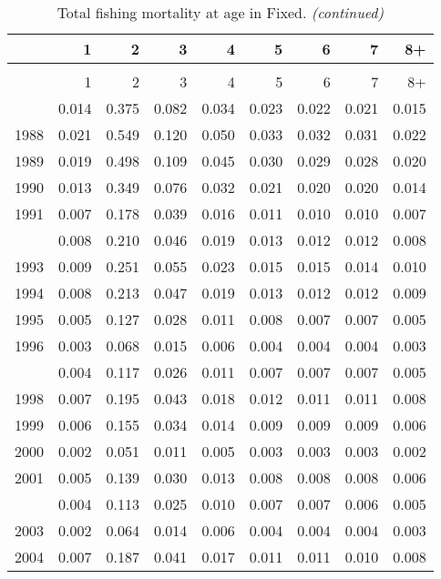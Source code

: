\documentclass[
]{article}
\begin{document}
\begin{longtable}[t]{lrrrrrrrr}
\caption{\label{tab:Fixed-fleet-FAA-table}Total fishing mortality at age in Fixed.}\\
\toprule
  & 1 & 2 & 3 & 4 & 5 & 6 & 7 & 8+\\
\midrule
\endfirsthead
\caption[]{Total fishing mortality at age in Fixed. \textit{(continued)}}\\
\toprule
  & 1 & 2 & 3 & 4 & 5 & 6 & 7 & 8+\\
\midrule
\endhead

\endfoot
\bottomrule
\endlastfoot
1987 & 0.014 & 0.375 & 0.082 & 0.034 & 0.023 & 0.022 & 0.021 & 0.015\\
1988 & 0.021 & 0.549 & 0.120 & 0.050 & 0.033 & 0.032 & 0.031 & 0.022\\
1989 & 0.019 & 0.498 & 0.109 & 0.045 & 0.030 & 0.029 & 0.028 & 0.020\\
1990 & 0.013 & 0.349 & 0.076 & 0.032 & 0.021 & 0.020 & 0.020 & 0.014\\
1991 & 0.007 & 0.178 & 0.039 & 0.016 & 0.011 & 0.010 & 0.010 & 0.007\\
\addlinespace
1992 & 0.008 & 0.210 & 0.046 & 0.019 & 0.013 & 0.012 & 0.012 & 0.008\\
1993 & 0.009 & 0.251 & 0.055 & 0.023 & 0.015 & 0.015 & 0.014 & 0.010\\
1994 & 0.008 & 0.213 & 0.047 & 0.019 & 0.013 & 0.012 & 0.012 & 0.009\\
1995 & 0.005 & 0.127 & 0.028 & 0.011 & 0.008 & 0.007 & 0.007 & 0.005\\
1996 & 0.003 & 0.068 & 0.015 & 0.006 & 0.004 & 0.004 & 0.004 & 0.003\\
\addlinespace
1997 & 0.004 & 0.117 & 0.026 & 0.011 & 0.007 & 0.007 & 0.007 & 0.005\\
1998 & 0.007 & 0.195 & 0.043 & 0.018 & 0.012 & 0.011 & 0.011 & 0.008\\
1999 & 0.006 & 0.155 & 0.034 & 0.014 & 0.009 & 0.009 & 0.009 & 0.006\\
2000 & 0.002 & 0.051 & 0.011 & 0.005 & 0.003 & 0.003 & 0.003 & 0.002\\
2001 & 0.005 & 0.139 & 0.030 & 0.013 & 0.008 & 0.008 & 0.008 & 0.006\\
\addlinespace
2002 & 0.004 & 0.113 & 0.025 & 0.010 & 0.007 & 0.007 & 0.006 & 0.005\\
2003 & 0.002 & 0.064 & 0.014 & 0.006 & 0.004 & 0.004 & 0.004 & 0.003\\
2004 & 0.007 & 0.187 & 0.041 & 0.017 & 0.011 & 0.011 & 0.010 & 0.008\\

\end{longtable}
\end{document}
